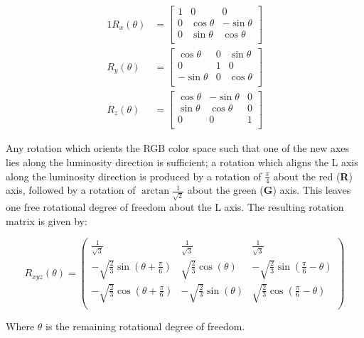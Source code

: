 \begin{alignat}{1}
R_x(\theta) &= \begin{bmatrix}
1 & 0 & 0 \\
0 & \cos \theta &  -\sin \theta \\[3pt]
0 & \sin \theta  &  \cos \theta \\[3pt]
\end{bmatrix} \\[6pt]
R_y(\theta) &= \begin{bmatrix}
\cos \theta & 0 & \sin \theta \\[3pt]
0 & 1 & 0 \\[3pt]
-\sin \theta & 0 & \cos \theta \\
\end{bmatrix} \\[6pt]
R_z(\theta) &= \begin{bmatrix}
\cos \theta &  -\sin \theta & 0 \\[3pt]
\sin \theta & \cos \theta & 0\\[3pt]
0 & 0 & 1\\
\end{bmatrix}
\end{alignat}


Any rotation which orients the RGB color space such that one of the new axes lies along the luminosity direction is sufficient; a rotation which aligns the L axis along the luminosity direction is produced by a rotation of $\frac{\pi}4$ about the red (\textbf{R}) axis, followed by a rotation of $\arctan{\frac{1}{\sqrt{2}}}$ about the green (\textbf{G}) axis. This leaves one free rotational degree of freedom about the L axis. The resulting rotation matrix is given by:

\begin{equation}
R_{xyz}(\theta) =
\left(
\begin{array}{ccc}
 \frac{1}{\sqrt{3}} & \frac{1}{\sqrt{3}} & \frac{1}{\sqrt{3}} \\
 -\sqrt{\frac{2}{3}} \sin \left(\theta +\frac{\pi }{6}\right) & \sqrt{\frac{2}{3}} \cos (\theta ) & -\sqrt{\frac{2}{3}} \sin \left(\frac{\pi }{6}-\theta \right) \\
 -\sqrt{\frac{2}{3}} \cos \left(\theta +\frac{\pi }{6}\right) & -\sqrt{\frac{2}{3}} \sin (\theta ) & \sqrt{\frac{2}{3}} \cos \left(\frac{\pi }{6}-\theta \right) \\
\end{array}
\right)
\end{equation}


Where $\theta$ is the remaining rotational degree of freedom.

